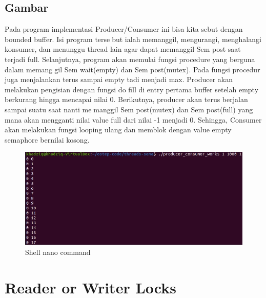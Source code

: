 \documentclass[11pt,a4paper]{article}
\begin{document}
\subsection{Gambar}
    Pada program implementasi Producer/Consumer ini bisa kita sebut dengan bounded buffer. Isi program tersebut ialah memanggil, mengurangi, menghalangi konsumer, dan menunggu thread lain agar dapat memanggil
    Sem post saat terjadi full. Selanjutnya, program akan memulai fungsi procedure yang berguna dalam memanggil Sem wait(empty) dan Sem post(mutex). Pada fungsi procedur juga menjalankan terus sampai empty tadi
    menjadi max. Producer akan melakukan pengisian dengan fungsi do fill di entry pertama buffer setelah empty
    berkurang hingga mencapai nilai 0. Berikutnya, producer akan terus berjalan sampai suatu saat nanti memanggil Sem post(mutex) dan Sem post(full) yang mana akan mengganti nilai value full dari nilai -1 menjadi
    0. Sehingga, Consumer akan melakukan fungsi looping ulang dan memblok dengan value empty semaphore
    bernilai kosong.

    \begin{figure}[h]
        \centering
        \includegraphics[scale = 0.6]{Figure/producer.png}
        \caption{Shell nano command}
        \label{fig:tut3_1}
    \end{figure}
\section{Reader or Writer Locks}
\end{document}
